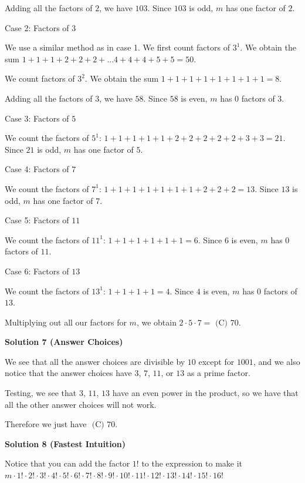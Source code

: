 \begin{enumerate}
 Adding all the factors of $2$, we have $103$. Since $103$ is odd, $m$ has one factor of $2$.

 Case 2: Factors of $3$

 We use a similar method as in case 1. We first count factors of $3^1$. We obtain the sum $1+1+1+2+2+2+...4+4+4+5+5=50$.

 We count factors of $3^2$. We obtain the sum $1+1+1+1+1+1+1+1=8$.

 Adding all the factors of $3$, we have $58$. Since $58$ is even, $m$ has $0$ factors of $3$.

 Case 3: Factors of $5$

 We count the factors of $5^1$: $1+1+1+1+1+2+2+2+2+2+3+3=21$. Since $21$ is odd, $m$ has one factor of $5$.

 Case 4: Factors of $7$

 We count the factors of $7^1$: $1+1+1+1+1+1+1+2+2+2=13$. Since $13$ is odd, $m$ has one factor of $7$.

 Case 5: Factors of $11$

 We count the factors of $11^1$: $1+1+1+1+1+1=6$. Since $6$ is even, $m$ has $0$ factors of $11$.

 Case 6: Factors of $13$

 We count the factors of $13^1$: $1+1+1+1=4$. Since $4$ is even, $m$ has $0$ factors of $13$.

 Multiplying out all our factors for $m$, we obtain $2\cdot5\cdot7=\boxed{\text{ (C) }70}$.

 



\textbf{Solution 7 (Answer Choices)}

We see that all the answer choices are divisible by $10$ except for $1001$, and we also notice that the answer choices have $3$, $7$, $11$, or $13$ as a prime factor.

 Testing, we see that $3$, $11$, $13$ have an even power in the product, so we have that all the other answer choices will not work.

 Therefore we just have $\boxed{\text{ (C) }70}$.

 



\textbf{Solution 8 (Fastest Intuition)}

Notice that you can add the factor $1!$ to the expression to make it $m\cdot1!\cdot2!\cdot3!\cdot4!\cdot5!\cdot6!\cdot7!\cdot8!\cdot9!\cdot10!\cdot11!\cdot12!\cdot13!\cdot14!\cdot15!\cdot16!$


\end{enumerate}
